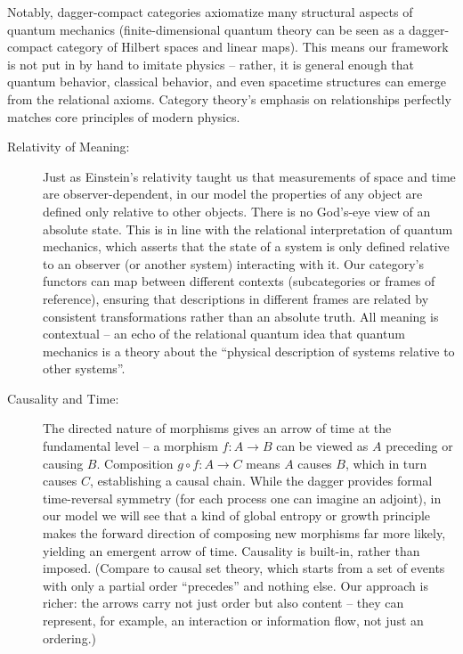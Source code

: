 \documentclass{article}
\begin{document}
Notably, dagger-compact categories axiomatize many structural aspects of quantum mechanics\cite{abramsky2009} (finite-dimensional quantum theory can be seen as a dagger-compact category of Hilbert spaces and linear maps). This means our framework is not put in by hand to imitate physics -- rather, it is general enough that quantum behavior, classical behavior, and even spacetime structures can emerge from the relational axioms. Category theory’s emphasis on relationships perfectly matches core principles of modern physics.

\begin{description}
\item[Relativity of Meaning:] Just as Einstein’s relativity taught us that measurements of space and time are observer-dependent, in our model the properties of any object are defined only relative to other objects. There is no God’s-eye view of an absolute state. This is in line with the relational interpretation of quantum mechanics, which asserts that the state of a system is only defined relative to an observer (or another system) interacting with it\cite{rovelli1996}. Our category’s functors can map between different contexts (subcategories or frames of reference), ensuring that descriptions in different frames are related by consistent transformations rather than an absolute truth. All meaning is contextual -- an echo of the relational quantum idea that quantum mechanics is a theory about the ``physical description of systems relative to other systems''\cite{rovelli1996}.

\item[Causality and Time:] The directed nature of morphisms gives an arrow of time at the fundamental level -- a morphism $f: A \to B$ can be viewed as $A$ preceding or causing $B$. Composition $g \circ f: A \to C$ means $A$ causes $B$, which in turn causes $C$, establishing a causal chain. While the dagger provides formal time-reversal symmetry (for each process one can imagine an adjoint), in our model we will see that a kind of global entropy or growth principle makes the forward direction of composing new morphisms far more likely, yielding an emergent arrow of time. Causality is built-in, rather than imposed. (Compare to causal set theory, which starts from a set of events with only a partial order ``precedes'' and nothing else\cite{bombelli1987}. Our approach is richer: the arrows carry not just order but also content -- they can represent, for example, an interaction or information flow, not just an ordering.)


\end{description}
\end{document}
